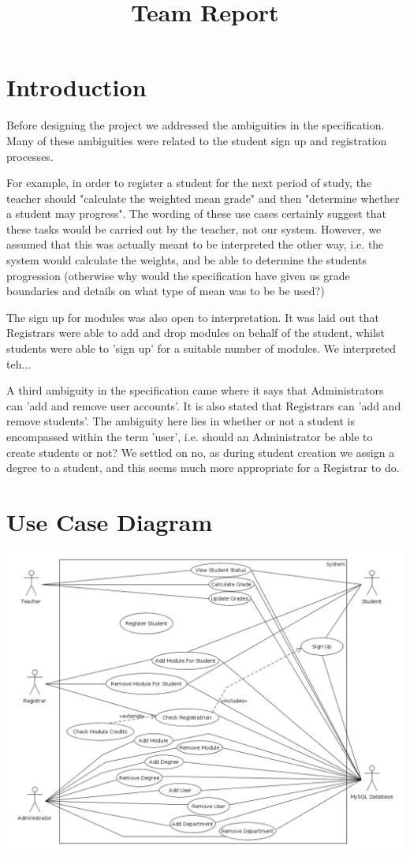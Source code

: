 \documentclass[12pt,a4paper]{article}
\title{Team Report}
\begin{document}
\maketitle

\section{Introduction}
Before designing the project we addressed the ambiguities in the specification.
Many of these ambiguities were related to the student sign up and registration
processes.

For example, in order to register a student for the next period of study, the
teacher  should "calculate the weighted mean grade" and then "determine
whether a student may progress". The wording of these use cases certainly suggest that
these tasks would be carried out by the teacher, not our system. However, we assumed
that this was actually meant to be interpreted the other way, i.e. the system
would calculate the weights, and be able to determine the students progression
(otherwise why would the specification have given us grade boundaries and details on what
type of mean was to be be used?)

The sign up for modules was also open to interpretation. It was laid out that
Registrars were able to add and drop modules on behalf of the student, whilst
students were able to 'sign up' for a suitable number of modules. We interpreted
teh...

A third ambiguity in the specification came where it says that Administrators can
'add and remove user accounts'. It is also stated that Registrars can 'add and remove
students'. The ambiguity here lies in whether or not a student is encompassed within
the term 'user', i.e. should an Administrator be able to create students or not? We
settled on no, as during student creation we assign a degree to a student, and this
seems much more appropriate for a Registrar to do.


\section{Use Case Diagram}

\includegraphics[width=\linewidth]{useCaseDiagram}
\end{document}
